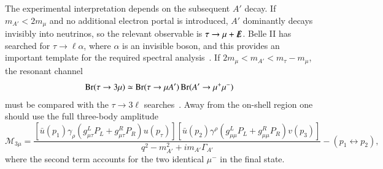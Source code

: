 \documentclass[onecolumn, aps, nofootinbib, prd, preprint, floats, floatfix, amsmath, amssymb, superscriptaddress, preprintnumbers]{revtex4-1}
\begin{document}
The experimental interpretation depends on the subsequent \(A'\) decay. If \(m_{A'}<2m_\mu\) and no additional electron portal is introduced, \(A'\) dominantly decays invisibly into neutrinos, so the relevant observable is \(\tau\to\mu+\slashed{E}\). Belle II has searched for \(\tau\to\ell\alpha\), where \(\alpha\) is an invisible boson, and this provides an important template for the required spectral analysis~\cite{Belle-II:2022heu}. If \(2m_\mu<m_{A'}<m_\tau-m_\mu\), the resonant channel
\begin{equation}
{\rm Br}(\tau\to3\mu)\simeq
{\rm Br}(\tau\to\mu A')\,{\rm Br}(A'\to\mu^+\mu^-)
\label{eq:tau-3mu-resonant}
\end{equation}
must be compared with the \(\tau\to3\ell\) searches~\cite{Belle:2010jhm,Belle-II:2024ami}. Away from the on-shell region one should use the full three-body amplitude
\begin{equation}
\mathcal{M}_{3\mu}=
\frac{
\left[\bar u(p_1)\gamma_\rho(g_{\mu\tau}^{L}P_L+g_{\mu\tau}^{R}P_R)u(p_\tau)\right]
\left[\bar u(p_2)\gamma^\rho(g_{\mu\mu}^{L}P_L+g_{\mu\mu}^{R}P_R)v(p_3)\right]}
{q^2-m_{A'}^2+i m_{A'}\Gamma_{A'}}
-(p_1\leftrightarrow p_2),
\label{eq:tau-3mu-amplitude}
\end{equation}
where the second term accounts for the two identical \(\mu^-\) in the final state.
\end{document}
